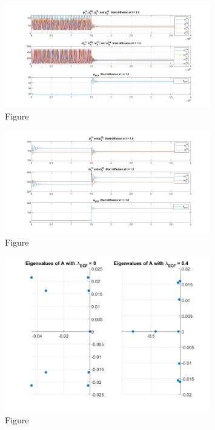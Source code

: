 \documentclass[12pt]{article}
\renewcommand{\(}{\left (}
\renewcommand{\)}{\right )}
\begin{document}
\begin{figure}[ht]
    \centering
	\begin{minipage}{0.99\textwidth}
		\centering
		\includegraphics[width=0.8\textwidth]{US_M.jpg}
		\caption*{\small Figure}
	\end{minipage}
\end{figure}


\begin{figure}[ht]
    \centering
	\begin{minipage}{0.99\textwidth}
		\centering
		\includegraphics[width=0.8\textwidth]{SS.jpg}
		\caption*{\small Figure}
	\end{minipage}
\end{figure}

\begin{figure}[ht]
    \centering
	\begin{minipage}{0.99\textwidth}
		\centering
		\includegraphics[width=0.8\textwidth]{SSEi.jpg}
		\caption*{\small Figure}
	\end{minipage}
\end{figure}
\end{document}
